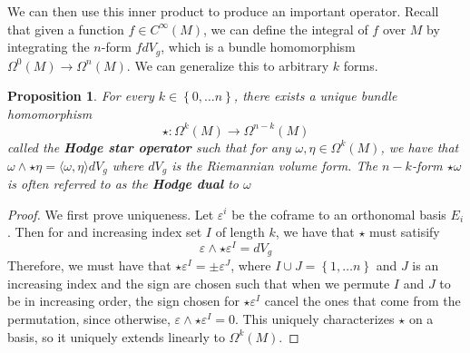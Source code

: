 \documentclass[psamsfonts]{amsart}
\newtheorem{prop}[thm]{Proposition}
\theoremstyle{definition}
\theoremstyle{remark}
\newcommand{\ib}[1]{\textbf{\textit{#1}}}
\newcommand{\set}[1]{\left\lbrace#1 \right\rbrace}
\begin{document}
We can then use this inner product to produce an important operator. Recall that given a function $f \in C^\infty(M)$, we can define the integral of $f$ over $M$ by integrating the $n$-form $fdV_g$, which is a bundle homomorphism $\Omega^0(M) \to \Omega^n(M)$. We can generalize this to arbitrary $k$ forms.
\begin{prop}
For every $k \in \set{0, \ldots  n}$, there exists a unique bundle homomorphism
$$\star: \Omega^{k}(M) \to \Omega^{n-k}(M)$$
called the \ib{Hodge star operator} such that for any $\omega, \eta  \in \Omega^k(M)$, we have that $\omega \wedge \star\eta = \langle \omega, \eta \rangle dV_g$ where $dV_g$ is the Riemannian volume form. The $n-k$-form $\star \omega$ is often referred to as the \ib{Hodge dual} to $\omega$
\end{prop}
\begin{proof}
We first prove uniqueness. Let $\varepsilon^i$  be the coframe to an orthonomal basis $E_i$. Then for and increasing index set $I$ of length $k$, we have that $\star$ must satisify 
$$\varepsilon \wedge \star \varepsilon^I = dV_g$$
Therefore, we must have that $\star \varepsilon^I = \pm \varepsilon^J$, where $I \cup J = \set{1, \ldots n}$ and $J$ is an increasing index and the sign are chosen such that when we permute $I$ and $J$ to be in increasing order, the sign chosen for $\star \varepsilon^I$ cancel the ones that come from the permutation, since otherwise, $\varepsilon \wedge \star \varepsilon^I = 0$. This uniquely characterizes $\star$ on a basis, so it uniquely extends linearly to $\Omega^k(M)$.
\end{proof}
\end{document}
